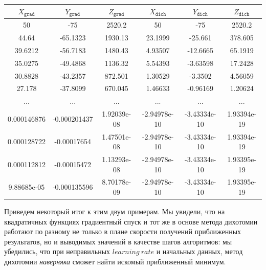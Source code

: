 \documentclass[12pt, a4paper, oneside, final]{article}
\begin{document}
	\begin{table}[H]
		\centering
		\begin{tabular}{|c|c|c|c|c|c|}
			$X_{\texttt{grad}}$ & $Y_{\texttt{grad}}$ & $Z_{\texttt{grad}}$ & $X_{\texttt{dich}}$ & $Y_{\texttt{dich}}$ & $Z_{\texttt{dich}}$ \\ \hline
			50 & -75 & 2520.2 & 50 & -75 & 2520.2 \\
			44.64 & -65.1323 & 1930.13 & 23.1999 & -25.661 & 378.605 \\
			39.6212 & -56.7183 & 1480.43 & 4.93507 & -12.6665 & 65.1919 \\
			35.0275 & -49.4868 & 1136.32 & 5.54393 & -3.63598 & 17.2428 \\
			30.8828 & -43.2357 & 872.501 & 1.30529 & -3.3502 & 4.56059 \\
			27.178 & -37.8099 & 670.045 & 1.46633 & -0.96169 & 1.20624 \\
			... & ... & ... & ... & ... & ... \\
			0.000146876 & -0.000201437 & 1.92039e-08 & -2.94978e-10 & -3.43334e-10 & 1.93394e-19 \\
			0.000128722 & -0.00017654 & 1.47501e-08 & -2.94978e-10 & -3.43334e-10 & 1.93394e-19 \\
			0.000112812 & -0.00015472 & 1.13293e-08 & -2.94978e-10 & -3.43334e-10 & 1.93395e-19 \\
			9.88685e-05 & -0.000135596 & 8.70178e-09 & -2.94978e-10 & -3.43334e-10 & 1.93395e-19
		\end{tabular}
	\end{table}
	Приведем некоторый итог к этим двум примерам. Мы увидели, что на квадратичных функциях градиентный спуск и тот же в основе метода дихотомии работают по разному не только в плане скорости получений приближенных результатов, но и выводимых значений в качестве шагов алгоритмов: мы убедились, что при неправильных $learning~rate$ и начальных данных, метод дихотомии \textit{наверняка} сможет найти искомый приближенный минимум.
	\newpage
\end{document}
